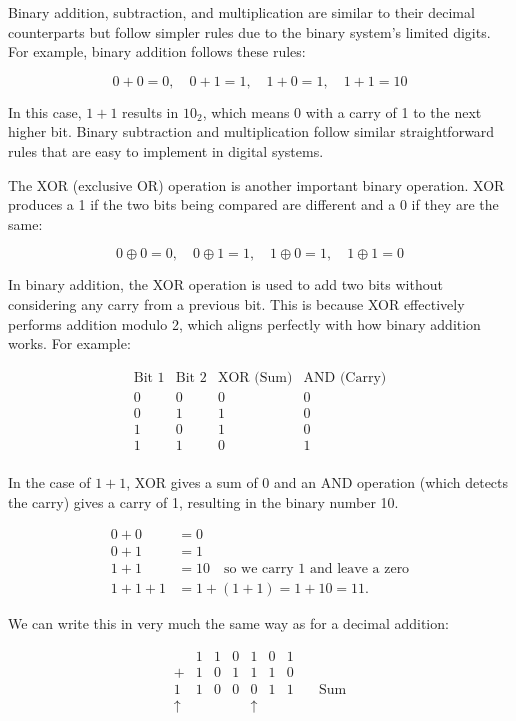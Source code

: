 Binary addition, subtraction, and multiplication are similar to their decimal counterparts but follow simpler rules due to the binary system's limited digits. For example, binary addition follows these rules:

\[
0 + 0 = 0, \quad 0 + 1 = 1, \quad 1 + 0 = 1, \quad 1 + 1 = 10
\]

In this case, \(1 + 1\) results in \(10_2\), which means 0 with a carry of 1 to the next higher bit. Binary subtraction and multiplication follow similar straightforward rules that are easy to implement in digital systems.

The XOR (exclusive OR) operation is another important binary operation. XOR produces a 1 if the two bits being compared are different and a 0 if they are the same:

\[
0 \oplus 0 = 0, \quad 0 \oplus 1 = 1, \quad 1 \oplus 0 = 1, \quad 1 \oplus 1 = 0
\]

In binary addition, the XOR operation is used to add two bits without considering any carry from a previous bit. This is because XOR effectively performs addition modulo 2, which aligns perfectly with how binary addition works. For example:

\[
\begin{array}{c|c|c|c}
\text{Bit 1} & \text{Bit 2} & \text{XOR (Sum)} & \text{AND (Carry)} \\
\hline
0 & 0 & 0 & 0 \\
0 & 1 & 1 & 0 \\
1 & 0 & 1 & 0 \\
1 & 1 & 0 & 1 \\
\end{array}
\]

In the case of \(1 + 1\), XOR gives a sum of 0 and an AND operation (which detects the carry) gives a carry of 1, resulting in the binary number 10.

\begin{align*}
0 + 0 &= 0 \\
0 + 1 &= 1 \\
1 + 1 &= 10 \quad \text{so we carry 1 and leave a zero} \\
1 + 1 + 1 &= 1 + (1 + 1) = 1 + 10 = 11.
\end{align*}

We can write this in very much the same way as for a decimal addition:

\[
\begin{array}{r|r|r|r|r|r|r|r}
& 1 & 1 & 0 & 1 & 0 & 1 & \\
+ & 1 & 0 & 1 & 1 & 1 & 0 & \\
\hline
1 & 1 & 0 & 0 & 0 & 1 & 1 & \quad \text{Sum} \\
\uparrow & & & & \uparrow & & & \\
& & & & & & &
\end{array}
\]

